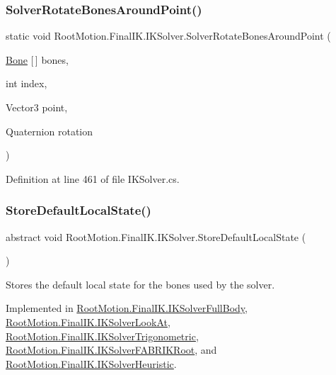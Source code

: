 \subsubsection{\texorpdfstring{Solver\+Rotate\+Bones\+Around\+Point()}{SolverRotateBonesAroundPoint()}}
{\footnotesize\ttfamily static void Root\+Motion.\+Final\+I\+K.\+I\+K\+Solver.\+Solver\+Rotate\+Bones\+Around\+Point (\begin{DoxyParamCaption}\item[{\mbox{\hyperlink{class_root_motion_1_1_final_i_k_1_1_i_k_solver_1_1_bone}{Bone}} \mbox{[}$\,$\mbox{]}}]{bones,  }\item[{int}]{index,  }\item[{Vector3}]{point,  }\item[{Quaternion}]{rotation }\end{DoxyParamCaption})\hspace{0.3cm}{\ttfamily [static]}}



Definition at line 461 of file I\+K\+Solver.\+cs.

\mbox{\label{class_root_motion_1_1_final_i_k_1_1_i_k_solver_a5009a12837b12c96fed91bc6dc0bd4b6}} 
\subsubsection{\texorpdfstring{Store\+Default\+Local\+State()}{StoreDefaultLocalState()}}
{\footnotesize\ttfamily abstract void Root\+Motion.\+Final\+I\+K.\+I\+K\+Solver.\+Store\+Default\+Local\+State (\begin{DoxyParamCaption}{ }\end{DoxyParamCaption})\hspace{0.3cm}{\ttfamily [pure virtual]}}



Stores the default local state for the bones used by the solver. 



Implemented in \mbox{\hyperlink{class_root_motion_1_1_final_i_k_1_1_i_k_solver_full_body_a6218fb49ef96ab8f19a6016c91cb26ad}{Root\+Motion.\+Final\+I\+K.\+I\+K\+Solver\+Full\+Body}}, \mbox{\hyperlink{class_root_motion_1_1_final_i_k_1_1_i_k_solver_look_at_a4afca882415d4749c312c52f349e1d0d}{Root\+Motion.\+Final\+I\+K.\+I\+K\+Solver\+Look\+At}}, \mbox{\hyperlink{class_root_motion_1_1_final_i_k_1_1_i_k_solver_trigonometric_a3bd5cac71942dfc1104cad6326469acb}{Root\+Motion.\+Final\+I\+K.\+I\+K\+Solver\+Trigonometric}}, \mbox{\hyperlink{class_root_motion_1_1_final_i_k_1_1_i_k_solver_f_a_b_r_i_k_root_a6c378e881e1e7dcb7a2ce54ce39e0e88}{Root\+Motion.\+Final\+I\+K.\+I\+K\+Solver\+F\+A\+B\+R\+I\+K\+Root}}, and \mbox{\hyperlink{class_root_motion_1_1_final_i_k_1_1_i_k_solver_heuristic_a58192848dbddf53c43c8ce54c3346557}{Root\+Motion.\+Final\+I\+K.\+I\+K\+Solver\+Heuristic}}.

